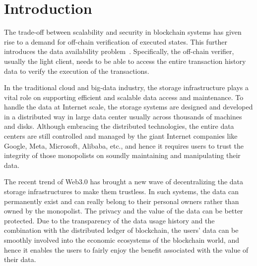 \section{Introduction}

The trade-off between scalability and security in blockchain systems has given rise to a demand for off-chain verification of executed states. This further introduces the data availability problem~\cite{da}. Specifically, the off-chain verifier, usually the light client, needs to be able to access the entire transaction history data to verify the execution of the transactions.  

In the traditional cloud and big-data industry, the storage infrastructure plays a vital role on supporting efficient and scalable data access and maintenance. To handle the data at Internet scale, the storage systems are designed and developed in a distributed way in large data center usually across thousands of machines and disks. Although embracing the distributed technologies, the entire data centers are still controlled and managed by the giant Internet companies like Google, Meta, Microsoft, Alibaba, etc., and hence it requires users to trust the integrity of those monopolists on soundly maintaining and manipulating their data. 

The recent trend of Web3.0 has brought a new wave of decentralizing the data storage infrastructures to make them trustless. In such systems, the data can permanently exist and can really belong to their personal owners rather than owned by the monopolist. The privacy and the value of the data can be better protected. Due to the transparency of the data usage history and the combination with the distributed ledger of blockchain, the users’ data can be smoothly involved into the economic ecosystems of the blockchain world, and hence it enables the users to fairly enjoy the benefit associated with the value of their data.

